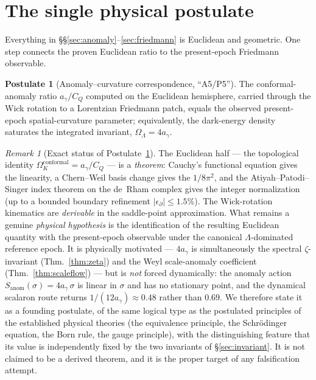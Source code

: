 \documentclass[11pt,a4paper]{article}
\theoremstyle{definition}
\newtheorem{postulate}{Postulate}
\theoremstyle{remark}
\newtheorem{remark}{Remark}
\newcommand{\ag}{a_\gamma}
\newcommand{\CQ}{C_Q}
\newcommand{\Ok}{\Omega_K}
\newcommand{\OL}{\Omega_\Lambda}
\begin{document}
\section{The single physical postulate}\label{sec:postulate}
Everything in \S\S\ref{sec:anomaly}--\ref{sec:friedmann} is Euclidean and geometric. One step
connects the proven Euclidean ratio to the present-epoch Friedmann observable.

\begin{postulate}[Anomaly--curvature correspondence, ``A5/P5'']\label{post:A5}
The conformal-anomaly ratio $\ag/\CQ$ computed on the Euclidean hemisphere, carried through the
Wick rotation to a Lorentzian Friedmann patch, equals the observed present-epoch spatial-curvature
parameter; equivalently, the dark-energy density saturates the integrated invariant, $\OL=4\ag$.
\end{postulate}

\begin{remark}[Exact status of Postulate~\ref{post:A5}]
The Euclidean half --- the topological identity $\Ok^{\mathrm{conformal}}=\ag/\CQ$ --- is a
\emph{theorem}: Cauchy's functional equation gives the linearity, a Chern--Weil basis change gives
the $1/8\pi^2$, and the Atiyah--Patodi--Singer index theorem on the de~Rham complex gives the
integer normalization (up to a bounded boundary refinement $\lvert\epsilon_\partial\rvert\le1.5\%$).
The Wick-rotation kinematics are \emph{derivable} in the saddle-point approximation. What remains a
genuine \emph{physical hypothesis} is the identification of the resulting Euclidean quantity with
the present-epoch observable under the canonical $\Lambda$-dominated reference epoch. It is
physically motivated --- $4\ag$ is simultaneously the spectral $\zeta$-invariant
(Thm.~\ref{thm:zeta}) and the Weyl scale-anomaly coefficient (Thm.~\ref{thm:scaleflow}) --- but is
\emph{not} forced dynamically: the anomaly action $S_{\mathrm{anom}}(\sigma)=4\ag\,\sigma$ is linear
in $\sigma$ and has no stationary point, and the dynamical scalaron route returns $1/(12\ag)\approx
0.48$ rather than $0.69$. We therefore state it as a founding postulate, of the same logical type as
the postulated principles of the established physical theories (the equivalence principle, the
Schr\"odinger equation, the Born rule, the gauge principle), with the distinguishing feature that
its value is independently fixed by the two invariants of \S\ref{sec:invariant}. It is not claimed
to be a derived theorem, and it is the proper target of any falsification attempt.
\end{remark}
\end{document}
